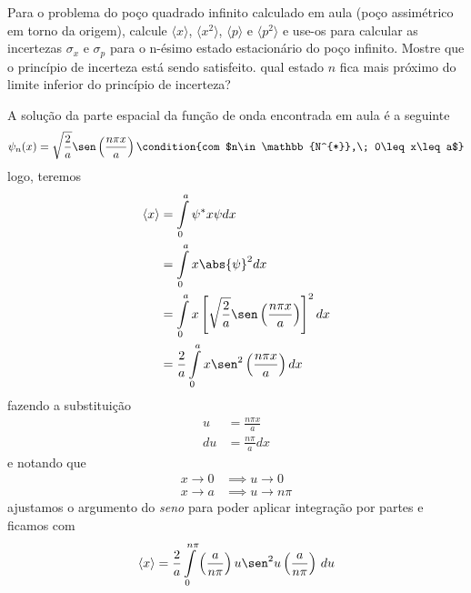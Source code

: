 \begin{prob}
	Para o problema do poço quadrado infinito calculado em aula (poço assimétrico em torno da origem), calcule $\langle x \rangle$, $\langle x^{2} \rangle$, $\langle p \rangle$ e $\langle p^{2} \rangle$ e use-os para calcular as incertezas $\sigma_{x}$ e $\sigma_{p}$ para o n-ésimo estado estacionário do poço infinito. Mostre que o princípio de incerteza está sendo satisfeito. qual estado $n$ fica mais próximo do limite inferior do princípio de incerteza?
	\begin{sol}
		A solução da parte espacial da função de onda encontrada em aula é a seguinte
		\begin{dmath*}
			\psi_{n}(x) = \sqrt{\frac{2}{a}}\sen \left(\frac{n \pi x}{a}\right)\condition{com $n\in \mathbb{N^{*}},\; 0\leq x\leq a$}
		\end{dmath*}
		logo, teremos
		\begin{align}
			\begin{split}
				\langle x \rangle &= \int\limits_{0}^{a} \psi^{*}x \psi dx\\
													&= \int\limits_{0}^{a}x \abs{\psi}^{2}dx\\
													&= \int\limits_{0}^{a}x \left[\sqrt{\frac{2}{a}}\sen \left(\frac{n \pi x}{a}\right)\right]^{2}dx\\
													&= \frac{2}{a}\int\limits_{0}^{a}x\sen^{2} \left(\frac{n \pi x}{a}\right)dx\\
			\end{split}
		\end{align}
		fazendo a substituição
		\begin{subequations}
			\begin{align}
				u &= \frac{n \pi x}{a}\\
				du &= \frac{n \pi}{a} dx
			\end{align}
		\end{subequations}
		e notando que
		\begin{subequations}
			\begin{align}
				x\to 0 &\implies u\to 0\\
				x\to a &\implies u\to n \pi
			\end{align}
		\end{subequations}
		ajustamos o argumento do \emph{seno} para poder aplicar integração por partes e ficamos com
		\begin{equation*}
			\begin{split}
				\langle x \rangle &= \frac{2}{a}\int\limits_{0}^{n \pi}\left(\frac{a}{n \pi}\right)u\sen^{2}u\left(\frac{a}{n \pi}\right)\,du\\

\end{split}
\end{equation*}
\end{sol}
\end{prob}
